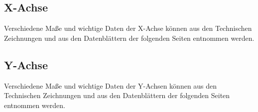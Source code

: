 \begin{figure}[htbp] 
  \centering
    
  \label{fig:Bild1}
\end{figure}













\subsection{X-Achse}

Verschiedene Maße und wichtige Daten der X-Achse können aus den Technischen Zeichnungen und aus den Datenblättern der folgenden Seiten entnommen werden.\\



\begin{figure}[htbp] 
  \centering
    
  \label{fig:Bild1}
\end{figure}

 
 









\subsection{Y-Achse}

Verschiedene Maße und wichtige Daten der Y-Achsen können aus den Technischen Zeichnungen und aus den Datenblättern der folgenden Seiten entnommen werden.\\
\newline


